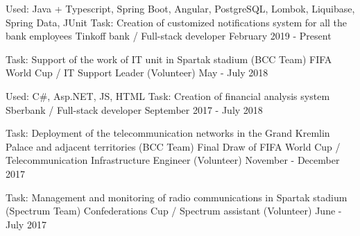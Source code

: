 

\vspace{0cm}\begin{cventries}
\cventry
{Used: Java + Typescript, Spring Boot, Angular, PostgreSQL, Lombok, Liquibase, Spring Data, JUnit
	\newline Task: Creation of customized notifications system for all the bank employees} %
{Tinkoff bank / Full-stack developer } %
{} %
{February 2019 - Present} %
\noindent	
	
\cventry
{Task: Support of the work of IT unit in Spartak stadium (BCC Team)} %
{FIFA World Cup / IT Support Leader (Volunteer)} %
{} %
{May - July 2018} %
\noindent	

\cventry
{Used: C\#, Asp.NET, JS, HTML
	\newline Task: Creation of financial analysis system} %
{Sberbank / Full-stack developer} %
{} %
{September 2017 - July 2018} %
\noindent	

\cventry
{Task: Deployment of the telecommunication networks in the Grand Kremlin Palace and adjacent territories (BCC Team)} %
{Final Draw of FIFA World Cup / Telecommunication Infrastructure Engineer (Volunteer)} %
{} %
{November - December 2017} %
\noindent	
	
\cventry
{Task: Management and monitoring of radio communications in Spartak stadium (Spectrum Team)} %
{Confederations Cup / Spectrum assistant (Volunteer)} %
{} %
{June - July 2017} %
\noindent	





\end{cventries}
